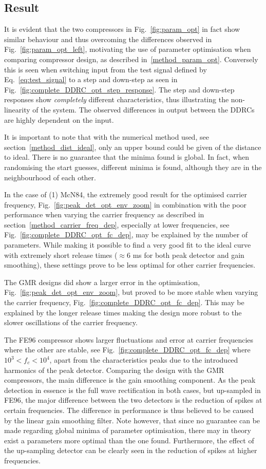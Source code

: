 \documentclass[../main2.tex]{subfiles}
\begin{document}
\subsection{Result}\label{discussion_results}
It is evident that the two compressors in Fig.~\ref{fig:param_opt} in fact show similar behaviour and thus overcoming the differences observed in Fig.~\ref{fig:param_opt_left}, motivating the use of parameter optimisation when comparing compressor design, as described in~\ref{method_param_opt}. Conversely this is seen when switching input from the test signal defined by Eq.~\ref{eq:test_signal} to a step and down-step as seen in Fig.~\ref{fig:complete_DDRC_opt_step_response}. The step and down-step responses show \emph{completely} different characteristics, thus illustrating the non-linearity of the system. The observed differences in output between the DDRCs are highly dependent on the input.

It is important to note that with the numerical method used, see section~\ref{method_dist_ideal}, only an upper bound could be given of the distance to ideal. There is no guarantee that the minima found is global. In fact, when randomising the start guesses, different minima is found, although they are in the neighbourhood of each other.

In the case of (1) McN84, the extremely good result for the optimised carrier frequency, Fig.~\ref{fig:peak_det_opt_env_zoom} in combination with the poor performance when varying the carrier frequency as described in section~\ref{method_carrier_freq_dep}, especially at lower frequencies, see Fig.~\ref{fig:complete_DDRC_opt_fc_dep}, may be explained by the number of parameters. While making it possible to find a very good fit to the ideal curve with extremely short release times ($\approx 6$ ms for both peak detector and gain smoothing), these settings prove to be less optimal for other carrier frequencies.

The GMR designs did show a larger error in the optimisation, Fig.~\ref{fig:peak_det_opt_env_zoom}, but proved to be more stable when varying the carrier frequency, Fig.~\ref{fig:complete_DDRC_opt_fc_dep}. This may be explained by the longer release times making the design more robust to the slower oscillations of the carrier frequency. 

The FE96 compressor shows larger fluctuations and error at carrier frequencies where the other are stable, see Fig.~\ref{fig:complete_DDRC_opt_fc_dep} where $10^3<f_c<10^4$, apart from the characteristics peaks due to the introduced harmonics of the peak detector. Comparing the design with the GMR compressors, the main difference is the gain smoothing component. As the peak detection in essence is the full wave rectification in both cases, but up-sampled in FE96, the major difference between the two detectors is the reduction of spikes at certain frequencies. The difference in performance is thus believed to be caused by the linear gain smoothing filter. Note however, that since no guarantee can be made regarding global minima of parameter optimisation, there may in theory exist a parameters more optimal than the one found. Furthermore, the effect of the up-sampling detector can be clearly seen in the reduction of spikes at higher frequencies.
\end{document}

